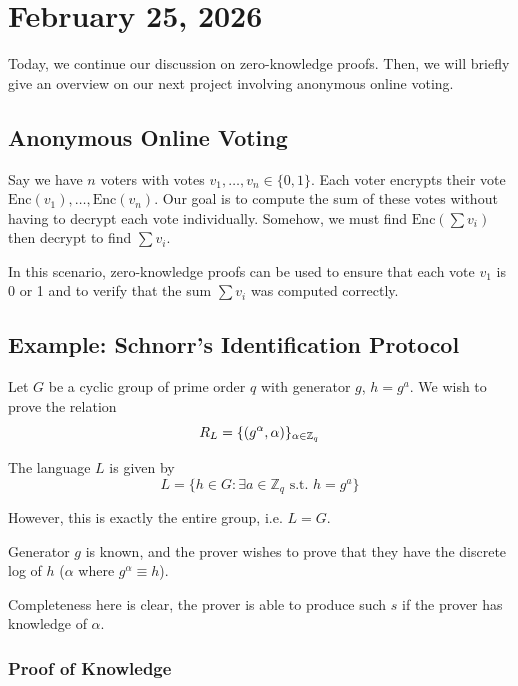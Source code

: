 \section{February 25, 2026}
\label{20260225}

Today, we continue our discussion on zero-knowledge proofs. Then, we will briefly give an overview on our next project involving anonymous online voting.

\subsection{Anonymous Online Voting}

Say we have $n$ voters with votes $v_1, \dots, v_n \in \{ 0, 1\}$. Each voter encrypts their vote $\text{Enc}(v_1), \dots, \text{Enc}(v_n)$. Our goal is to compute the sum of these votes without having to decrypt each vote individually. Somehow, we must find $\text{Enc}(\sum v_i)$ then decrypt to find $\sum v_i$.

In this scenario, zero-knowledge proofs can be used to ensure that each vote $v_1$ is 0 or 1 and to verify that the sum $\sum v_i$ was computed correctly.

\subsection{Example: Schnorr's Identification Protocol}\label{sec:mar7-schnorr}

Let $G$ be a cyclic group of prime order $q$ with generator $g$, $h = g^a$. We wish to prove the relation
\[R_L = \{(g^\alpha, \alpha)\}_{\alpha\in \mathbb Z_q}\]

The language $L$ is given by
\[L = \{ h\in G: \exists a \in \mathbb{Z}_q \text{ s.t. }h = g^a\}\]

However, this is exactly the entire group, i.e. $L = G$. 

Generator $g$ is known, and the prover wishes to prove that they have the discrete log of $h$ ($\alpha$ where $g^\alpha\equiv h$).


Completeness here is clear, the prover is able to produce such $s$ if the prover has knowledge of $\alpha$.

\subsubsection{Proof of Knowledge}

